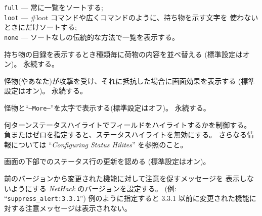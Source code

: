 {\tt full} --- 常に一覧をソートする;\\
{\tt loot} --- \#loot コマンドや広くコマンドのように、持ち物を示す文字を
使わないときにだけソートする;\\
{\tt none} --- ソートなしの伝統的な方法で一覧を表示する。
\item[\ib{sortpack}]
持ち物の目録を表示するとき種類毎に荷物の内容を並べ替える
(標準設定はオン)。
永続する。
\item[\ib{sparkle}]
怪物(やあなた)が攻撃を受け、それに抵抗した場合に画面効果を表示する
(標準設定はオン)。
永続する。
\item[\ib{standout}]
怪物と``{\tt --More--}''を太字で表示する(標準設定はオフ)。
永続する。
\item[\ib{statushilites}]
何ターンステータスハイライトでフィールドをハイライトするかを制御する。
負またはゼロを指定すると、ステータスハイライトを無効にする。
さらなる情報については ``{\it Configuring Status Hilites\/}'' を参照のこと。
\item[\ib{status\verb+_+updates}]
画面の下部でのステータス行の更新を認める (標準設定はオン)。
\item[\ib{suppress\verb+_+alert}]
前のバージョンから変更された機能に対して注意を促すメッセージを
表示しないようにする {\it NetHack\/} のバージョンを設定する。
(例: ``{\tt suppress\verb+_+alert:3.3.1}'')
例のように指定すると 3.3.1 以前に変更された機能に対する注意メッセージは表示されない。
\item[\ib{symset}]
